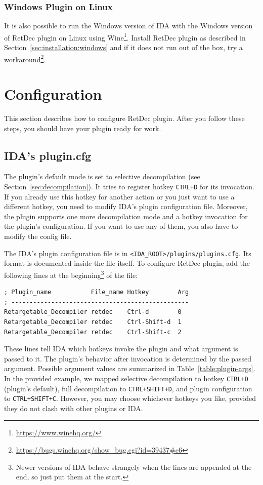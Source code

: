 \documentclass[pdftex, a4paper,12pt, oneside, svgnames]{article}
\begin{document}
\subsubsection{Windows Plugin on Linux}
It is also possible to run the Windows version of IDA with the Windows version of RetDec plugin on Linux using Wine\footnote{\url{https://www.winehq.org/}}. Install RetDec plugin as described in Section~\ref{sec:installation:windows} and if it does not run out of the box, try a workaround\footnote{\url{https://bugs.winehq.org/show_bug.cgi?id=39437\#c6}}.

\section{Configuration}
\label{sec:configuration}
This section describes how to configure RetDec plugin. After you follow these steps, you should have your plugin ready for work.

\subsection{IDA's plugin.cfg}
\label{sec:config:plugin-cfg}
The plugin's default mode is set to selective decompilation (see Section~\ref{sec:decompilation}). It tries to register hotkey \texttt{CTRL+D} for its invocation. If you already use this hotkey for another action or you just want to use a different hotkey, you need to modify IDA's plugin configuration file. Moreover, the plugin supports one more decompilation mode and a hotkey invocation for the plugin's configuration. If you want to use any of them, you also have to modify the config file.

The IDA's plugin configuration file is in \texttt{<IDA\_ROOT>/plugins/plugins.cfg}. Its format is documented inside the file itself. To configure RetDec plugin, add the following lines at the beginning\footnote{Newer versions of IDA behave strangely when the lines are appended at the end, so just put them at the start.} of the file:
\begin{verbatim}
; Plugin_name           File_name Hotkey        Arg
; -------------------------------------------------
Retargetable_Decompiler retdec    Ctrl-d        0
Retargetable_Decompiler retdec    Ctrl-Shift-d  1
Retargetable_Decompiler retdec    Ctrl-Shift-c  2
\end{verbatim}
These lines tell IDA which hotkeys invoke the plugin and what argument is passed to it. The plugin's behavior after invocation is determined by the passed argument. Possible argument values are summarized in Table~\ref{table:plugin-args}. In the provided example, we mapped selective decompilation to hotkey \texttt{CTRL+D} (plugin's default), full decompilation to \texttt{CTRL+SHIFT+D}, and plugin configuration to \texttt{CTRL+SHIFT+C}. However, you may choose whichever hotkeys you like, provided they do not clash with other plugins or IDA.
\end{document}
